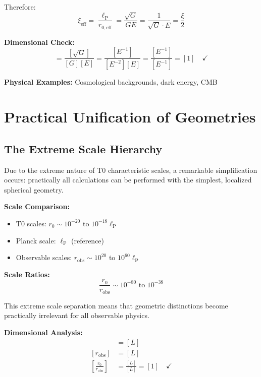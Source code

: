 \documentclass[12pt,a4paper]{report}
\newcommand{\lP}{\ell_{\text{P}}}         %
\newcommand{\rzero}{r_0}                  %
\begin{document}
	Therefore:
	\begin{equation}
		\xi_{\text{eff}} = \frac{\lP}{r_{0,\text{eff}}} = \frac{\sqrt{G}}{GE} = \frac{1}{\sqrt{G} \cdot E} = \frac{\xi}{2}
	\end{equation}
	
	\textbf{Dimensional Check:}
	\begin{equation}
		[\xi_{\text{eff}}] = \frac{[\sqrt{G}]}{[G][E]} = \frac{[E^{-1}]}{[E^{-2}][E]} = \frac{[E^{-1}]}{[E^{-1}]} = [1] \quad \checkmark
	\end{equation}
	
	\textbf{Physical Examples:} Cosmological backgrounds, dark energy, CMB
	
	\section{Practical Unification of Geometries}\label{sec:practical_unification}
	
	\subsection{The Extreme Scale Hierarchy}\label{subsec:extreme_scale_hierarchy}
	
	Due to the extreme nature of T0 characteristic scales, a remarkable simplification occurs: practically all calculations can be performed with the simplest, localized spherical geometry.
	
	\textbf{Scale Comparison:}
	\begin{itemize}
		\item T0 scales: $\rzero \sim 10^{-20}$ to $10^{-18} \lP$
		\item Planck scale: $\lP$ (reference)
		\item Observable scales: $r_{\text{obs}} \sim 10^{20}$ to $10^{60} \lP$
	\end{itemize}
	
	\textbf{Scale Ratios:}
	\begin{equation}
		\frac{\rzero}{r_{\text{obs}}} \sim 10^{-80} \text{ to } 10^{-38}
	\end{equation}
	
	This extreme scale separation means that geometric distinctions become practically irrelevant for all observable physics.
	
	\textbf{Dimensional Analysis:}
	\begin{align}
		[\rzero] &= [L] \\
		[r_{\text{obs}}] &= [L] \\
		\left[\frac{\rzero}{r_{\text{obs}}}\right] &= \frac{[L]}{[L]} = [1] \quad \checkmark
	\end{align}
	
\end{document}
